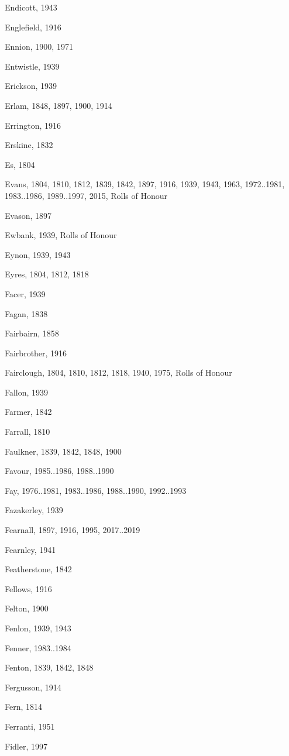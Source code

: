 \begin{theindex}
\item Endicott, 1943
\item Englefield, 1916
\item Ennion, 1900, 1971
\item Entwistle, 1939
\item Erickson, 1939
\item Erlam, 1848, 1897, 1900, 1914
\item Errington, 1916
\item Erskine, 1832
\item Es, 1804
\item Evans, 1804, 1810, 1812, 1839, 1842, 1897, 1916, 1939, 1943, 1963, 1972..1981, 1983..1986, 1989..1997, 2015, Rolls of Honour
\item Evason, 1897
\item Ewbank, 1939, Rolls of Honour
\item Eynon, 1939, 1943
\item Eyres, 1804, 1812, 1818
\item Facer, 1939
\item Fagan, 1838
\item Fairbairn, 1858
\item Fairbrother, 1916
\item Fairclough, 1804, 1810, 1812, 1818, 1940, 1975, Rolls of Honour
\item Fallon, 1939
\item Farmer, 1842
\item Farrall, 1810
\item Faulkner, 1839, 1842, 1848, 1900
\item Favour, 1985..1986, 1988..1990
\item Fay, 1976..1981, 1983..1986, 1988..1990, 1992..1993
\item Fazakerley, 1939
\item Fearnall, 1897, 1916, 1995, 2017..2019
\item Fearnley, 1941
\item Featherstone, 1842
\item Fellows, 1916
\item Felton, 1900
\item Fenlon, 1939, 1943
\item Fenner, 1983..1984
\item Fenton, 1839, 1842, 1848
\item Fergusson, 1914
\item Fern, 1814
\item Ferranti, 1951
\item Fidler, 1997

\end{theindex}
